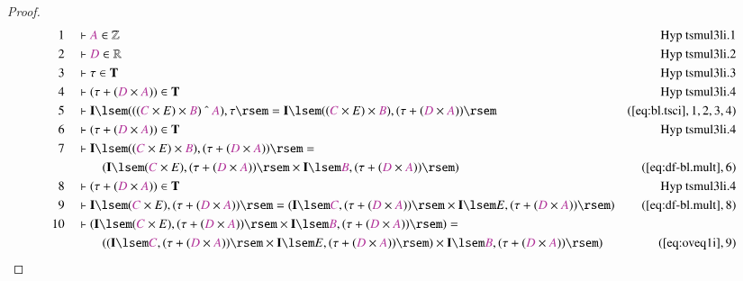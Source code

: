 \begin{proof}
\begin{align}
  1 &&  & \vdash \mc{A} \in
      \mathbb{Z}&\text{Hyp~tsmul3li.1}\notag%
  \\ 2 &&  & \vdash \mc{D} \in
      \mathbb{R}&\text{Hyp~tsmul3li.2}\notag%
  \\ 3 &&  & \vdash \tau \in
      \mathbf{T}&\text{Hyp~tsmul3li.3}\notag%
  \\ 4 &&  & \vdash ( \tau + ( \mc{D} \times \mc{A} ) ) \in
      \mathbf{T}&\text{Hyp~tsmul3li.4}\notag%
  \\ 5 &&  & \vdash \mathbf{I} \lsem ( ( ( \mc{C} \times E ) \times \mc{B} )
      ~\string^~ \mc{A} ) , \tau \rsem = \mathbf{I} \lsem (
      ( \mc{C} \times E ) \times \mc{B} ) , ( \tau + ( \mc{D}
      \times \mc{A} ) )
      \rsem&(\mbox{\ref{eq:bl.tsci}},1,2,3,4)\notag
  \\ 6 &&  & \vdash ( \tau + ( \mc{D} \times \mc{A} ) ) \in
      \mathbf{T}&\text{Hyp~tsmul3li.4}\notag%
  \\ 7 &&  & \vdash \mathbf{I} \lsem ( ( \mc{C} \times E ) \times \mc{B} ) , (
      \tau + ( \mc{D} \times \mc{A} ) ) \rsem =  \notag \\ & & & \qquad
     ( \mathbf{I}
      \lsem ( \mc{C} \times E ) , ( \tau + ( \mc{D} \times
      \mc{A} ) ) \rsem \times \mathbf{I} \lsem \mc{B} , (
      \tau + ( \mc{D} \times \mc{A} ) ) \rsem
      )&(\mbox{\ref{eq:df-bl.mult}},6)\notag
  \\ 8 &&  & \vdash ( \tau + ( \mc{D} \times \mc{A} ) ) \in
      \mathbf{T}&\text{Hyp~tsmul3li.4}\notag%
  \\ 9 &&  & \vdash \mathbf{I} \lsem ( \mc{C} \times E ) , ( \tau + ( \mc{D}
      \times \mc{A} ) ) \rsem = ( \mathbf{I} \lsem \mc{C} ,
      ( \tau + ( \mc{D} \times \mc{A} ) ) \rsem \times
      \mathbf{I} \lsem E , ( \tau + ( \mc{D} \times \mc{A} )
      ) \rsem )&(\mbox{\ref{eq:df-bl.mult}},8)\notag
  \\ 10 &&  & \vdash ( \mathbf{I} \lsem ( \mc{C} \times E ) , ( \tau + ( \mc{D}
      \times \mc{A} ) ) \rsem \times \mathbf{I} \lsem \mc{B}
      , ( \tau + ( \mc{D} \times \mc{A} ) ) \rsem ) =  \notag \\ & & & \qquad
     ( (
      \mathbf{I} \lsem \mc{C} , ( \tau + ( \mc{D} \times
      \mc{A} ) ) \rsem \times \mathbf{I} \lsem E , ( \tau +
      ( \mc{D} \times \mc{A} ) ) \rsem ) \times \mathbf{I}
      \lsem \mc{B} , ( \tau + ( \mc{D} \times \mc{A} ) )
      \rsem )&(\mbox{\ref{eq:oveq1i}},9)\notag

\end{align}
\end{proof}
